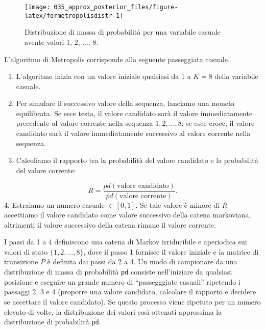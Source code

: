 \documentclass[
]{memoir}
\begin{document}
\begin{figure}

{\centering \texttt{[image: 035\_approx\_posterior\_files/figure-latex/formetropolisdistr-1]} 

}

\caption{Distribuzione di massa di probabilità per una variabile casuale avente valori 1, 2, ..., 8.}\label{fig:formetropolisdistr}
\end{figure}

\noindent
L'algoritmo di Metropolis corrisponde alla seguente passeggiata casuale.

\begin{enumerate}
\def\labelenumi{\arabic{enumi}.}
\item
  L'algoritmo inizia con un valore iniziale qualsiasi da 1 a \(K=8\) della variabile casuale.
\item
  Per simulare il successivo valore della sequenza, lanciamo una moneta equilibrata. Se esce testa, il valore candidato sarà il valore immediatamente precedente al valore corrente nella sequenza \(1, 2, \dots, 8\); se esce croce, il valore candidato sarà il valore immediatamente successivo al valore corrente nella sequenza.
\item
  Calcoliamo il rapporto tra la probabilità del valore candidato e la probabilità del valore corrente:
\end{enumerate}

\[
R = \frac{pd(\text{valore candidato})}{pd(\text{valore corrente})}.
\]
4. Estraiamo un numero casuale \(\in [0, 1]\). Se tale valore è minore di \(R\) accettiamo il valore candidato come valore successivo della catena markoviana, altrimenti il valore successivo della catena rimane il valore corrente.

\bigskip

I passi da 1 a 4 definiscono una catena di Markov irriducibile e aperiodica sui valori di stato \(\{1, 2,\dots, 8\}\), dove il passo 1 fornisce il valore iniziale e la matrice di transizione \(P\) è definita dai passi da 2 a 4. Un modo di campionare da una distribuzione di massa di probabilità \texttt{pd} consiste nell'iniziare da qualsiasi posizione e eseguire un grande numero di ``passegggiate casuali'' ripetendo i passaggi 2, 3 e 4 (proporre una valore candidato, calcolare il rapporto e decidere se accettare il valore candidato). Se questo processo viene ripetuto per un numero elevato di volte, la distribuzione dei valori così ottenuti approssima la distribuzione di probabilità \texttt{pd}.
\end{document}
